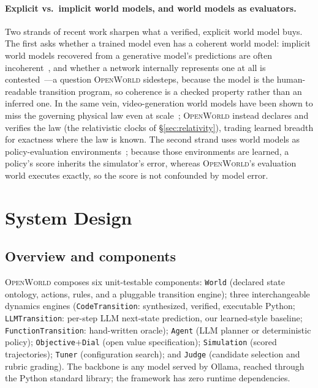\documentclass[11pt]{article}
\newcommand{\openworld}{\textsc{OpenWorld}}
\begin{document}
\paragraph{Explicit vs.\ implicit world models, and world models as evaluators.}
Two strands of recent work sharpen what a verified, explicit world model
buys. The first asks whether a trained model even has a coherent world
model: implicit world models recovered from a generative model's predictions are
often incoherent~\cite{vafa2024evaluating}, and whether a network internally
represents one at all is contested~\cite{li2025what}---a question
\openworld{} sidesteps, because the model is the human-readable transition
program, so coherence is a checked property rather than an inferred one. In the
same vein, video-generation world models have been shown to miss the governing
physical law even at scale~\cite{kang2024how}; \openworld{} instead
declares and verifies the law (the relativistic clocks of
\S\ref{sec:relativity}), trading learned breadth for exactness where the law is
known. The second strand uses world models as policy-evaluation
environments~\cite{quevedo2025worldgym}; because those environments are learned,
a policy's score inherits the simulator's error, whereas \openworld{}'s
evaluation world executes exactly, so the score is not confounded by model error.

\section{System Design}
\subsection{Overview and components}
\openworld{} composes six unit-testable components: \texttt{World} (declared
state ontology, actions, rules, and a pluggable transition engine); three
interchangeable dynamics engines (\texttt{CodeTransition}: synthesized,
verified, executable Python; \texttt{LLMTransition}: per-step LLM next-state
prediction, our learned-style baseline; \texttt{FunctionTransition}:
hand-written oracle); \texttt{Agent} (LLM planner or deterministic policy);
\texttt{Objective}+\texttt{Dial} (open value specification);
\texttt{Simulation} (scored trajectories); \texttt{Tuner} (configuration
search); and \texttt{Judge} (candidate selection and rubric grading). The
backbone is any model served by Ollama, reached through the Python standard
library; the framework has zero runtime dependencies.
\end{document}
